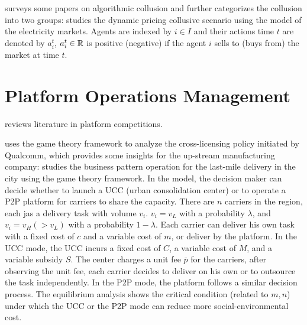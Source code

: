 \documentclass[12pt]{report}
\begin{document}
\cite{calvano2023algorithmic} surveys some papers on algorithmic collusion and further categorizes the collusion into two groups:
\cite{abada2023artificial} studies the dynamic pricing collusive scenario using the model of the electricity markets. Agents are indexed by $i\in I$ and their actions time $t$ are denoted by $a_i^t$, $a_i^t\in\RR$ is positive
(negative) if the agent $i$ sells to (buys from) the market at time $t$.

\clearpage
\section{Platform Operations Management}

\cite{rietveld2021platform} reviews literature in platform competitions.

\cite{wang2023} uses the game theory framework to analyze the cross-licensing policy initiated by Qualcomm, which provides some insights
for the up-stream manufacturing company:
\cite{deng2021urban} studies the business pattern operation for the last-mile delivery in the city using the game theory framework.
In the model, the decision maker can decide whether to launch a UCC (urban consolidation center) or to operate a P2P platform for carriers to share the capacity.
There are $n$ carriers in the region, each jas a delivery task with volume $v_i$. $v_i=v_L$ with a probability $\lambda$, and $v_i=v_H(>v_L)$ with a probability
$1-\lambda$. Each carrier can deliver his own task with a fixed cost of $c$ and a variable cost of $m$, or deliver by the platform.
In the UCC mode, the UCC incurs a fixed cost of $C$, a variable cost of $M$, and a variable subsidy $S$. The center charges a unit fee $\bar{p}$ for the carriers, after observing the unit fee, each carrier
decides to deliver on his own or to outsource the task independently. In the P2P mode, the platform follows a similar decision process.
The equilibrium analysis shows the critical condition (related to $m, n$) under which the UCC or the P2P mode can reduce more social-environmental cost.
\end{document}
